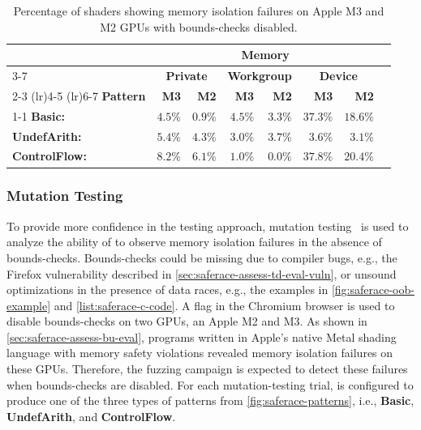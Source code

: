 \begin{table}
\centering
\caption{Percentage of shaders showing memory isolation failures on Apple M3 and M2 GPUs with bounds-checks disabled.}

\begingroup
{}
\begin{tabular}{l r r r r r r r}
\toprule
& \multicolumn{6}{c}{\textbf{Memory}} \\
\cmidrule(lr){3-7}
& \multicolumn{2}{c}{\textbf{Private}} & \multicolumn{2}{c}{\textbf{Workgroup}} & \multicolumn{2}{c}{\textbf{Device}} \\
\cmidrule(lr){2-3} \cmidrule(lr){4-5} \cmidrule(lr){6-7}
\textbf{Pattern} & \textbf{M3} & \textbf{M2} & \textbf{M3} & \textbf{M2} & \textbf{M3} & \textbf{M2} \\
\cmidrule(lr){1-1}
\textbf{Basic:} & $4.5\%$ & $0.9\%$ & $4.5\%$ & $3.3\%$ & $37.3\%$ & $18.6\%$ \\
\textbf{UndefArith:} & $5.4\%$ & $4.3\%$ & $3.0\%$ & $3.7\%$ & $3.6\%$ & $3.1\%$ \\
\textbf{ControlFlow:} & $8.2\%$ & $6.1\%$ & $1.0\%$ & $0.0\%$ & $37.8\%$ & $20.4\%$ \\
\bottomrule
\end{tabular}
\endgroup
\label{tab:saferace-mut-testing}
\end{table}

\subsubsection{Mutation Testing} To provide more confidence in the testing approach, mutation testing~\cite{demillo1978hints} is used to analyze the ability of \wgslmemsmith to observe memory isolation failures in the absence of bounds-checks. Bounds-checks could be missing due to compiler bugs, e.g., the Firefox vulnerability described in \mysec\ref{sec:saferace-assess-td-eval-vuln}, or unsound optimizations in the presence of data races, e.g., the examples in \myfig\ref{fig:saferace-oob-example} and \mylisting\ref{list:saferace-c-code}. A flag in the Chromium browser is used to disable bounds-checks on two GPUs, an Apple M2 and M3. As shown in \mysec\ref{sec:saferace-assess-bu-eval}, programs written in Apple's native Metal shading language with memory safety violations revealed memory isolation failures on these GPUs. Therefore, the fuzzing campaign is expected to detect these failures when bounds-checks are disabled. For each mutation-testing trial, \wgslmemsmith is configured to produce one of the three types of patterns from \myfig\ref{fig:saferace-patterns}, i.e., \textbf{Basic}, \textbf{UndefArith}, and \textbf{ControlFlow}.

